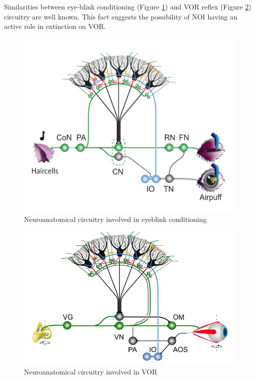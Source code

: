 \documentclass[12pt, a4paper,twoside]{tesi_upf}
\begin{document}
Similarities between eye-blink conditioning (Figure \ref {fig:eyeblinkcircuitry}) and VOR reflex (Figure \ref {fig:vorcircuitry}) circuitry are well known. This fact suggests the possibility of NOI having an active role in extinction on VOR.

\begin{figure}
  \centering
  \includegraphics[scale=0.50]{images/schonewille-ebc.png}
  \caption[Neuroanatomical circuitry involved in eyeblink conditioning]{Neuroanatomical circuitry involved in eyeblink conditioning \cite{Schonewille2011}}
  \label{fig:eyeblinkcircuitry}
\end{figure}

\begin{figure}
  \centering
  \includegraphics[scale=0.50]{images/schonewille.png}
  \caption[Neuroanatomical circuitry involved in VOR]{Neuroanatomical circuitry involved in VOR \cite{Schonewille2011}}
  \label{fig:vorcircuitry}
\end{figure}
\end{document}
